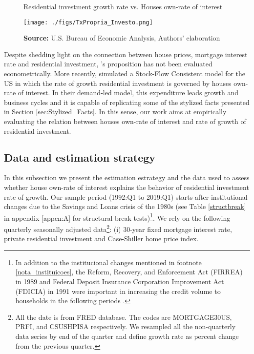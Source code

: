 \documentclass[12pt, a4paper]{article}
\begin{document}
\begin{figure}[htb]
	\centering
	\caption{Residential investment growth rate vs. Houses own-rate of interest}
	\label{propria_investo}
	\texttt{[image: ./figs/TxPropria\_Investo.png]}
	\caption*{\textbf{Source:} U.S. Bureau of Economic Analysis, Authors' elaboration}
\end{figure}

Despite shedding light on the connection between house prices, mortgage interest rate and residential investment, \citeauthor*{teixeira_crescimento_2015}'s \citeyear{teixeira_crescimento_2015} proposition has not been evaluated econometrically.
More recently, \textcite{petrini_2021_TD} simulated a Stock-Flow Consistent model for the US in which the rate of growth residential investment is governed by houses own-rate of interest.
In their demand-led model, this expenditure leads growth and business cycles and it is capable of replicating some of the stylized facts presented in Section \ref{sec:Stylized_Facts}.
In this sense, our work aims at empirically evaluating the relation between houses own-rate of interest and rate of growth of residential investment.


\subsection{Data and estimation strategy}
\label{sec:orgc1e7d06}
\label{sec:estimation}

In this subsection we present the estimation estrategy and the data used to assess whether house own-rate of interest explains the behavior of residential investment rate of growth.
Our sample period (1992:Q1 to 2019:Q1) starts after institutional changes due to the Savings and Loans crisis of the 1980s (see Table \ref{structbreak} in appendix \ref{appen:A} for structural break tests)\footnote{In addition to the institucional changes mentioned in footnote  \ref{nota_instituicoes}, the Reform, Recovery, and Enforcement Act (FIRREA) in 1989 and Federal Deposit Insurance Corporation Improvement Act (FDICIA) in 1991 were important in increasing the credit volume to households in the following periods \cite{wall_too_2010}.}.
We rely on the following  quarterly seasonally adjusted data\footnote{All the date is from FRED database. The codes are MORTGAGE30US, PRFI, and CSUSHPISA respectively. We resampled all the non-quarterly data series by end of the quarter and define growth rate as percent change from the previous quarter.}: (i) 30-year fixed mortgage interest rate, private residential investment and Case-Shiller home price index.
\end{document}
